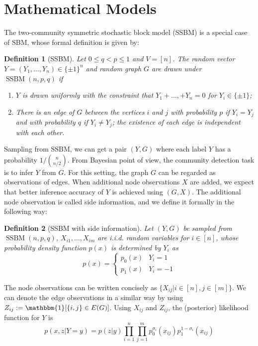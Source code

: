 \documentclass[conference]{IEEEtran}
\newtheorem{definition}{Definition}
\DeclareMathOperator{\SSBM}{SSBM}
\begin{document}
\section{Mathematical Models}\label{s:model}
The two-community symmetric stochastic block model (SSBM) is a special case of SBM, whose formal definition is given by:
\begin{definition}[SSBM]
	Let $0\leq q<p\leq 1$ and $V=[n]$. The random vector $Y=(Y_1,\dots,Y_n)\in \{\pm 1\}^n$ and random graph $G$ are drawn under $\SSBM(n,p,q)$ if
	\begin{enumerate}
		\item $Y$ is drawn uniformly with the constraint that $Y_1 + \dots, + Y_n = 0$ for $Y_i \in \{\pm 1 \}$;
		
		\item There is an edge of $G$ between the vertices $i$ and $j$ with probability $p$ if $Y_i=Y_j$ and with probability $q$ if $Y_i \neq Y_j$; the existence of each edge is independent with each other.
	\end{enumerate}
\end{definition}
Sampling from SSBM, we can get a pair $(Y,G)$ where each label $Y$ has a probability $ 1/ \binom{n}{n/2}$.
From Bayesian point of view, the community detection task is to infer $Y$ from $G$.
For this setting, the graph $G$ can be regarded as observations of edges. When
additional node observations $X$ are added, we expect that better inference accuracy of $Y$ is achieved using $(G,X)$.
The additional node observation is called side information, and we define it formally in the following way:
\begin{definition}[SSBM with side information]
	Let $(Y,G)$ be sampled from $\SSBM(n,p,q)$, $X_{i1}, \dots, X_{im}$ are i.i.d. random variables for $i \in [n]$,
	whose probability density function $p(x)$ is determined by $Y_i$ as
	\begin{equation}
	p(x) = \begin{cases}
	p_0(x) & Y_i = 1 \\
	p_1(x) & Y_i = -1
	\end{cases}
	\end{equation}
\end{definition}
The node observations can be written concisely as $\{X_{ij} | i \in [n], j \in [m]\}$.
We can denote the edge observations in a similar way by using $Z_{ij}:=\mathbbm{1}[\{i,j\} \in E(G)]$.
Using $X_{ij}$ and $Z_{ij}$, the (posterior) likelihood function for $Y$ is
\begin{equation}\label{eq:lh}
    p(x, z| Y=y) = p(z|y)\prod_{i=1}^n \prod_{j=1}^m p^{\sigma_i}_0(x_{ij})p^{1-\sigma_i}_1(x_{ij}) 
\end{equation}
\end{document}
